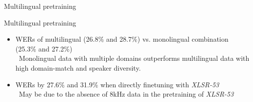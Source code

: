 \begin{frame}{Multilingual pretraining}
    
\end{frame}

\begin{frame}{Multilingual pretraining}
\begin{itemize}
    \item WERs of multilingual (26.8\% and 28.7\%) vs. monolingual combination (25.3\% and 27.2\%) 
    \\ \textrightarrow \, 
    Monolingual data with multiple domains outperforms multilingual data with high domain-match and speaker diversity.
        
    \item WERs by 27.6\% and 31.9\% when directly finetuning with \textit{XLSR-53} 
    \\ \textrightarrow \,
    May be due to the absence of 8kHz data in the pretraining of \textit{XLSR-53}
\end{itemize}
\end{frame}